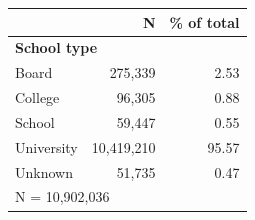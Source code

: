 \begin{tabular}{lrr}


\toprule


 & N & \% of total \\


\midrule


\multicolumn{3}{l}{\textbf{School type}}\\ 
\midrule
Board               &     275,339&        2.53\\
College             &      96,305&        0.88\\
School              &      59,447&        0.55\\
University          &  10,419,210&       95.57\\
Unknown             &      51,735&        0.47\\
\midrule


\multicolumn{3}{l}{\footnotesize N =   10,902,036}\\


\bottomrule


\end{tabular}


